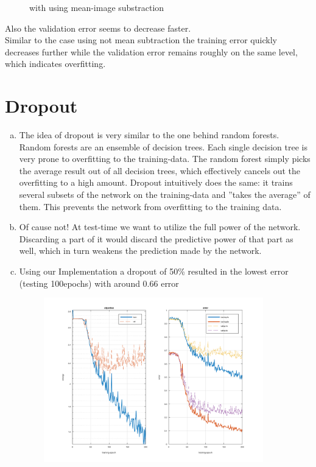 \documentclass[12pt]{article}
\begin{document}
\begin{enumerate}[a)]
\begin{figure}[H]
                \caption{with using mean-image substraction}
        \end{figure}
        Also the validation error seems to decrease faster.\\
        Similar to the case using not mean subtraction the training error quickly decreases further while the validation error remains roughly on the same level, which indicates overfitting.
\end{enumerate}


\newpage
\section{Dropout}

\begin{enumerate}[a)]
    \item 
        The idea of dropout is very similar to the one behind random forests. Random forests are an ensemble of decision trees. Each single decision tree is very prone to overfitting to the training-data. The random forest simply picks the average result out of all decision trees, which effectively cancels out the overfitting to a high amount. Dropout intuitively does the same: it trains several subsets of the network on the training-data and ''takes the average'' of them. This prevents the network from overfitting to the training data.
    \item
        Of cause not! At test-time we want to utilize the full power of the network. Discarding a part of it would discard the predictive power of that part as well, which in turn weakens the prediction made by the network.
    \item
        Using our Implementation a dropout of 50\% resulted in the lowest error (testing 100epochs) with around 0.66 error 
        \begin{figure}[H]
            \centering
                \includegraphics[width=0.9\textwidth]{Plots/3_50_200.png}

\end{figure}
\end{enumerate}
\end{document}
